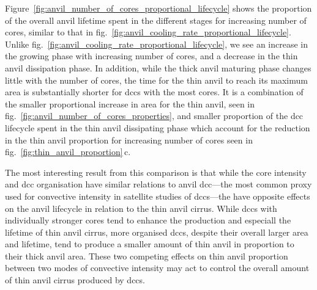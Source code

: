Figure~\ref{fig:anvil_number_of_cores_proportional_lifecycle} shows the proportion of the overall anvil lifetime spent in the different stages for increasing number of cores, similar to that in fig.~\ref{fig:anvil_cooling_rate_proportional_lifecycle}.
Unlike fig.~\ref{fig:anvil_cooling_rate_proportional_lifecycle}, we see an increase in the growing phase with increasing number of cores, and a decrease in the thin anvil dissipation phase.
In addition, while the thick anvil maturing phase changes little with the number of cores, the time for the thin anvil to reach its maximum area is substantially shorter for \acrshort{dcc}s with the most cores.
It is a combination of the smaller proportional increase in area for the thin anvil, seen in fig.~\ref{fig:anvil_number_of_cores_properties}, and smaller proportion of the \acrshort{dcc} lifecycle spent in the thin anvil dissipating phase which account for the reduction in the thin anvil proportion for increasing number of cores seen in fig.~\ref{fig:thin_anvil_proportion}\,c.

The most interesting result from this comparison is that while the core intensity and \acrshort{dcc} organisation have similar relations to anvil \acrshort{dcc}---the most common proxy used for convective intensity in satellite studies of \acrshort{dcc}s---the have opposite effects on the anvil lifecycle in relation to the thin anvil cirrus.
While \acrshort{dcc}s with individually stronger cores tend to enhance the production and especiall the lifetime of thin anvil cirrus, more organised \acrshort{dcc}s, despite their overall larger area and lifetime, tend to produce a smaller amount of thin anvil in proportion to their thick anvil area.
These two competing effects on thin anvil proportion between two modes of convective intensity may act to control the overall amount of thin anvil cirrus produced by \acrshort{dcc}s.




